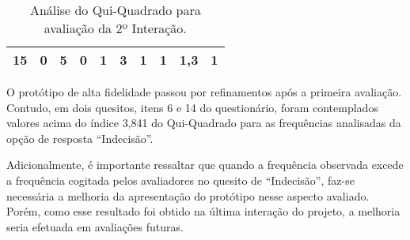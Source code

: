 \begin{landscape}
\begin{table}[h]
\begin{tabular}{|c|c|c|c|c|c|c|c|c|c|}
						15 & 0 & 5 & 0 & 1 & 3 & 1 & 1 & 1,3 & 1 \\

						\hline

					\end{tabular}
					\caption[Análise do Qui-Quadrado para avaliação da 2º Interação]{Análise do Qui-Quadrado para avaliação da 2º Interação.}
					\label{tab:terceiraAvaliacao2_tables}
				\end{table}

				O protótipo de alta fidelidade passou por refinamentos após a primeira avaliação. Contudo, em dois quesitos, itens 6 e 14 do questionário, foram contemplados valores acima do índice 3,841 do Qui-Quadrado para as frequências analisadas da opção de resposta “Indecisão”.
				
				Adicionalmente, é importante ressaltar que quando a frequência observada excede a frequência cogitada pelos avaliadores no quesito de “Indecisão”, faz-se necessária a melhoria da apresentação do protótipo nesse aspecto avaliado. Porém, como esse resultado foi obtido na última interação do projeto, a melhoria seria efetuada em avaliações futuras.

				\end{landscape}